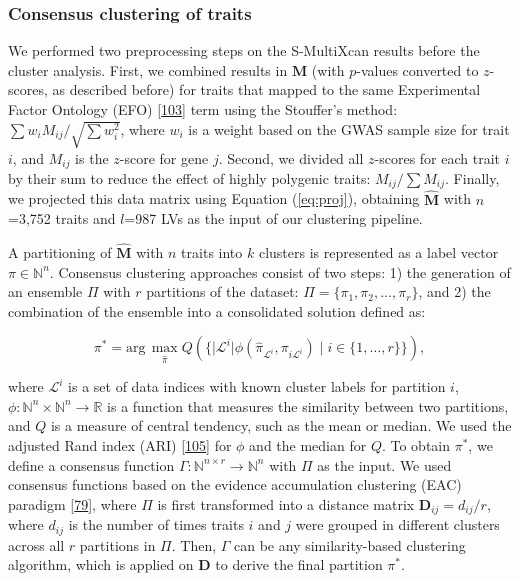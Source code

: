 \documentclass[
]{article}
\begin{document}
\hypertarget{sec:methods:clustering}{%
\subsubsection{Consensus clustering of traits}\label{sec:methods:clustering}}

We performed two preprocessing steps on the S-MultiXcan results before the cluster analysis.
First, we combined results in \(\mathbf{M}\) (with \(p\)-values converted to \(z\)-scores, as described before) for traits that mapped to the same Experimental Factor Ontology (EFO) {[}\protect\hyperlink{ref-9okjVu3s}{103}{]} term using the Stouffer's method: \(\sum w_i M_{ij} / \sqrt{\sum w_i^2}\), where \(w_i\) is a weight based on the GWAS sample size for trait \(i\), and \(M_{ij}\) is the \(z\)-score for gene \(j\).
Second, we divided all \(z\)-scores for each trait \(i\) by their sum to reduce the effect of highly polygenic traits: \(M_{ij} / \sum M_{ij}\).
Finally, we projected this data matrix using Equation (\ref{eq:proj}), obtaining \(\hat{\mathbf{M}}\) with \(n\)=3,752 traits and \(l\)=987 LVs as the input of our clustering pipeline.

A partitioning of \(\hat{\mathbf{M}}\) with \(n\) traits into \(k\) clusters is represented as a label vector \(\pi \in \mathbb{N}^n\).
Consensus clustering approaches consist of two steps:
1) the generation of an ensemble \(\Pi\) with \(r\) partitions of the dataset: \(\Pi=\{\pi_1, \pi_2, \ldots, \pi_r\}\),
and 2) the combination of the ensemble into a consolidated solution defined as:

\begin{equation}
\pi^* = \mathrm{arg}\,\underset{\hat{\pi}}{\max} Q(\{ \lvert \mathcal{L}^i \lvert \phi(\hat{\pi}_{\mathcal{L}^i}, \pi_{i \mathcal{L}^i}) \mid i \in \{1,\ldots,r\} \}),
\label{eq:consensus:obj_func}\end{equation}

where \(\mathcal{L}^i\) is a set of data indices with known cluster labels for partition \(i\),
\(\phi\colon \mathbb{N}^n \times \mathbb{N}^n \to \mathbb{R}\) is a function that measures the similarity between two partitions,
and \(Q\) is a measure of central tendency, such as the mean or median.
We used the adjusted Rand index (ARI) {[}\protect\hyperlink{ref-e4AuoW8N}{105}{]} for \(\phi\) and the median for \(Q\).
To obtain \(\pi^*\), we define a consensus function \(\Gamma\colon \mathbb{N}^{n \times r} \to \mathbb{N}^n\) with \(\Pi\) as the input.
We used consensus functions based on the evidence accumulation clustering (EAC) paradigm {[}\protect\hyperlink{ref-cuROQDFa}{79}{]}, where \(\Pi\) is first transformed into a distance matrix
\(\mathbf{D}_{ij} = d_{ij} / r\),
where \(d_{ij}\) is the number of times traits \(i\) and \(j\) were grouped in different clusters across all \(r\) partitions in \(\Pi\).
Then, \(\Gamma\) can be any similarity-based clustering algorithm, which is applied on \(\mathbf{D}\) to derive the final partition \(\pi^*\).
\end{document}
